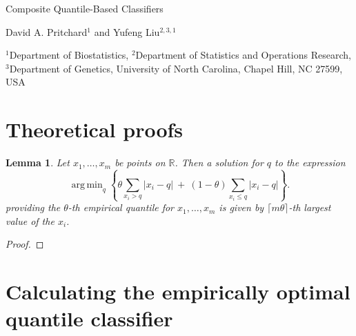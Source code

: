 \documentclass{article}
\DeclareMathOperator*{\argmin}{arg\,min}
\newtheorem{lemma}[theorem]{Lemma}
\begin{document}
\begin{center}

  {\LARGE Composite Quantile-Based Classifiers} \vspace{5mm}

  {\large David A. Pritchard$^1$ and Yufeng Liu$^{2,3,1}$} \vspace{5mm}

  {\large
    $^1$Department of Biostatistics,
    $^2$Department of Statistics and Operations Research,
    $^3$Department of Genetics,
    University of North Carolina, Chapel Hill, NC 27599, USA
  }

\end{center}

\section{Theoretical proofs}
\label{sec:theoretical-proofs}

\begin{lemma}
  \label{lem:empirical-quantlev}
  Let $x_1, \dots, x_m$ be points on $\mathbb{R}$.  Then a solution for $q$ to
  the expression
  \begin{equation}
    \label{eq:empirical-quantile}
    \argmin_q \left\{
      \theta \sum_{ x_{i} > q } |x_{i} - q| ~+~
      (1 - \theta) \sum_{ x_{i} \leq q } |x_{i} - q|
    \right\}.
  \end{equation}
  providing the $\theta$-th empirical quantile for
  $x_1, \dots, x_m$ is given by $\lceil m \theta \rceil$-th largest value of the
  $x_i$.
\end{lemma}

\begin{proof}
  
\end{proof}




\section{Calculating the empirically optimal quantile classifier}
\label{sec:empirically-optimal-algo}
\end{document}
